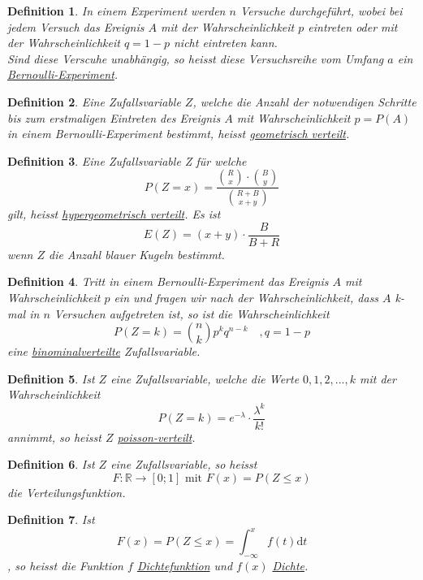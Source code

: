 \documentclass{article}
\newtheorem{mydef}{Definition}
\begin{document}
\begin{mydef}
In einem Experiment werden $n$ Versuche durchgeführt, wobei bei jedem Versuch das Ereignis $A$ mit der Wahrscheinlichkeit $p$ eintreten oder mit der Wahrscheinlichkeit $q = 1-p$ nicht eintreten kann.\\
Sind diese Verscuhe unabhängig, so heisst diese Versuchsreihe vom Umfang $a$ ein \underline{Bernoulli-Experiment}.
\end{mydef}
\begin{mydef}
Eine Zufallsvariable $Z$, welche die Anzahl der notwendigen Schritte bis zum erstmaligen Eintreten des Ereignis $A$ mit Wahrscheinlichkeit $p = P(A)$ in einem Bernoulli-Experiment bestimmt, heisst \underline{geometrisch verteilt}.
\end{mydef}
\begin{mydef}
Eine Zufallsvariable Z für welche
\begin{equation}
P(Z=x) = \frac{\binom{R}{x} \cdot \binom{B}{y}}{\binom{R+B}{x+y}}
\end{equation}
gilt, heisst \underline{hypergeometrisch verteilt}. Es ist
\begin{equation}
E(Z) = (x+y) \cdot \frac{B}{B+R}
\end{equation}
wenn $Z$ die Anzahl blauer Kugeln bestimmt.
\end{mydef}
\begin{mydef}Tritt in einem Bernoulli-Experiment das Ereignis $A$ mit Wahrscheinlichkeit $p$ ein und fragen wir nach der Wahrscheinlichkeit, dass $A$ k-mal in $n$ Versuchen aufgetreten ist, so ist die Wahrscheinlichkeit
\begin{equation}
P(Z=k) = \binom{n}{k} p^kq^{n-k} \quad , q=1-p
\end{equation}
eine \underline{binominalverteilte} Zufallsvariable.
\end{mydef}
\begin{mydef}
Ist $Z$ eine Zufallsvariable, welche die Werte $0, 1, 2, ..., k$ mit der Wahrscheinlichkeit
\begin{equation}
P(Z=k) = e^{-\lambda} \cdot \frac{\lambda^k}{k!}
\end{equation}
annimmt, so heisst $Z$ \underline{poisson-verteilt}.
\end{mydef}
\begin{mydef}
Ist $Z$ eine Zufallsvariable, so heisst
\begin{equation}
F: \mathbb{R} \longrightarrow [0;1] \mbox{ mit } F(x) = P(Z \leq x)
\end{equation}
die Verteilungsfunktion.
\end{mydef}
\begin{mydef}
Ist
\begin{equation}
F(x) = P(Z \leq x) = \int_{-\infty}^{x}{f(t)} \mathrm{d}t
\end{equation}
, so heisst die Funktion $f$ \underline{Dichtefunktion} und $f(x)$ \underline{Dichte}.
\end{mydef}
\end{document}
